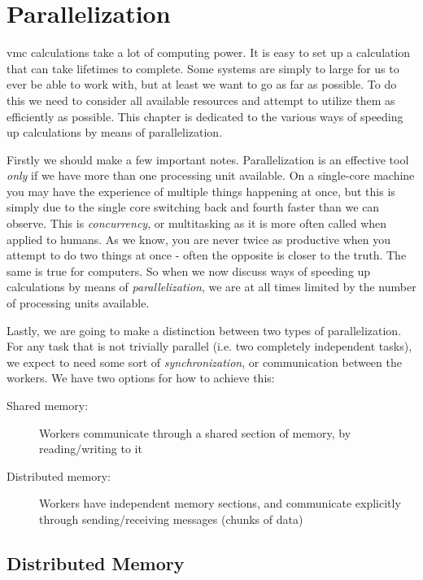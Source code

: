 \documentclass[Thesis.tex]{subfiles}
\begin{document}
\chapter{Parallelization}
\label{chp:parallelization}

\Acrlong{vmc} calculations take a lot of computing power. It is easy
to set up a calculation that can take lifetimes to complete. Some systems are
simply to large for us to ever be able to work with, but at least we want to go
as far as possible. To do this we need to consider all available resources and
attempt to utilize them as efficiently as possible. This chapter is dedicated to
the various ways of speeding up calculations by means of parallelization.

Firstly we should make a few important notes. Parallelization is an effective
tool \emph{only} if we have more than one processing unit available. On a
single-core machine you may have the experience of multiple things
happening at once, but this is simply due to the single core switching back and
fourth faster than we can observe. This is \emph{concurrency}, or multitasking
as it is more often called when applied to humans. As we know, you are never
twice as productive when you attempt to do two things at once - often the
opposite is closer to the truth. The same is true for computers. So when we now
discuss ways of speeding up calculations by means of \emph{parallelization}, we are
at all times limited by the number of processing units available.

Lastly, we are going to make a distinction between two types of parallelization.
For any task that is not trivially parallel (i.e. two completely independent
tasks), we expect to need some sort of \emph{synchronization}, or communication
between the workers. We have two options for how to achieve this:

\begin{description}
\item[Shared memory:] Workers communicate through a shared section of memory, by
  reading/writing to it
  \item[Distributed memory:] Workers have independent memory sections, and
    communicate explicitly through sending/receiving messages (chunks of data)
\end{description}

\section{Distributed Memory}
\end{document}
